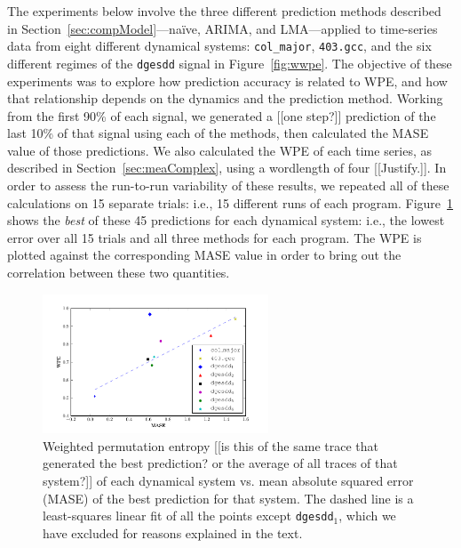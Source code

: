The experiments below involve the three different prediction methods
described in Section~\ref{sec:compModel}---na\"ive, ARIMA, and
LMA---applied to time-series data from eight different dynamical
systems: {\tt col\_major}, {\tt 403.gcc}, and the six different
regimes of the {\tt dgesdd} signal in Figure~\ref{fig:wwpe}.  The
objective of these experiments was to explore how prediction accuracy
is related to WPE, and how that relationship depends on the dynamics
and the prediction method.  Working from the first 90\% of each
signal, we generated a {\color{red} [[one step?]]}  prediction of the
last 10\% of that signal using each of the methods, then calculated
the MASE value of those predictions.  We also calculated the WPE of
each time series, as described in Section~\ref{sec:meaComplex}, using
a wordlength of four {\color{red}[[Justify.]]}.  In order to assess
the run-to-run variability of these results, we repeated all of these
calculations on 15 separate trials: i.e., 15 different runs of each
program.  Figure~\ref{fig:wpe_vs_mase_best} shows the {\sl best} of
these 45 predictions for each dynamical system: i.e., the lowest error
over all 15 trials and all three methods for each program.  The WPE is
plotted against the corresponding MASE value in order to bring out the
correlation between these two quantities.
\begin{figure}[htbp]
  \centering
  \includegraphics[width=0.6\textwidth]{figs/prediction_vs_entropy}
  \caption{Weighted permutation entropy {\color{red} [[is this of the
          same trace that generated the best prediction?  or the
          average of all traces of that system?]]}  of each dynamical
    system vs. mean absolute squared error (MASE) of the best
    prediction for that system.
% 
% 
The dashed line is a least-squares linear fit of all the points except
{\tt dgesdd$_1$}, which we have excluded for reasons explained in the
text.}
  \label{fig:wpe_vs_mase_best}
\end{figure}

